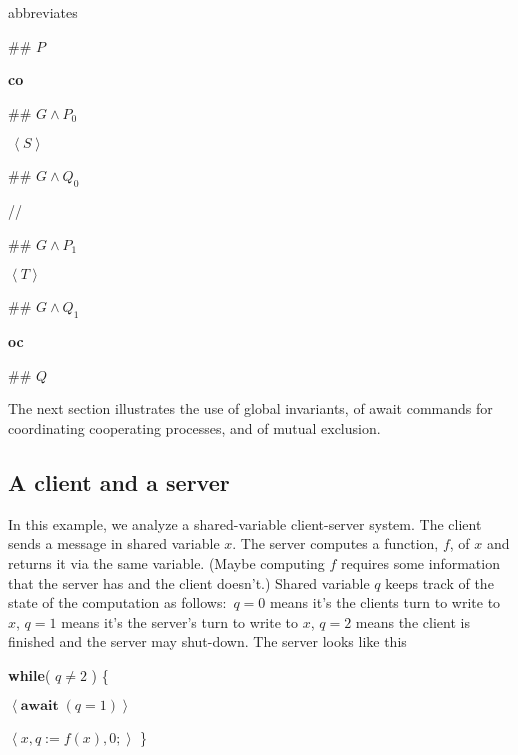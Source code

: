 \documentclass[muchmore,11pt]{article}%
\begin{document}
\noindent abbreviates

\begin{code}
\#\# $P$

\textbf{co}

\begin{indent}
\item \#\# $G\wedge P_{0}$

\item $\,\left\langle S\right\rangle $

\item \#\# $G\wedge Q_{0}$
\end{indent}

//

\begin{indent}
\item \#\# $G\wedge P_{1}$

\item $\left\langle T\right\rangle $

\item \#\# $G\wedge Q_{1}$
\end{indent}

\textbf{oc}

\#\# $Q$
\end{code}

The next section illustrates the use of global invariants, of await commands
for coordinating cooperating processes, and of mutual exclusion.

\subsection{A client and a server}

In this example, we analyze a shared-variable client-server system. The client
sends a message in shared variable $x$. The server computes a function, $f$,
of $x$ and returns it via the same variable. (Maybe computing $f$ requires
some information that the server has and the client doesn't.) Shared variable
$q$ keeps track of the state of the computation as follows:\ $q=0$ means it's
the clients turn to write to $x$, $q=1$ means it's the server's turn to write
to $x$, $q=2$ means the client is finished and the server may shut-down. The
server looks like this

\begin{code}
\textbf{while}( $q\neq2$ ) \{

\begin{indent}
\item $\left\langle \mathbf{await\;}(q=1)\right\rangle $

\item $\left\langle x,q:=f(x),0;\right\rangle $ \}
\end{indent}
\end{code}
\end{document}
